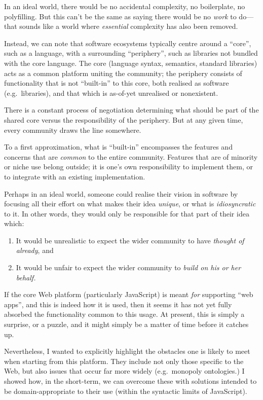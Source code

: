 In an ideal world, there would be no accidental complexity, no
boilerplate, no polyfilling. But this can't be the same as saying there
would be no \emph{work} to do---that sounds like a world where
\emph{essential} complexity has also been removed.

Instead, we can note that software ecosystems typically centre around a
``core'', such as a language, with a surrounding ``periphery'', such as
libraries not bundled with the core language. The core (language syntax,
semantics, standard libraries) acts as a common platform uniting the
community; the periphery consists of functionality that is not
``built-in'' to this core, both realised as software (e.g.~libraries),
and that which is as-of-yet unrealised or nonexistent.

There is a constant process of negotiation determining what should be
part of the shared core versus the responsibility of the periphery. But
at any given time, every community draws the line somewhere.

To a first approximation, what is ``built-in'' encompasses the features
and concerns that are \emph{common} to the entire community. Features
that are of minority or niche use belong outside; it is one's own
responsibility to implement them, or to integrate with an existing
implementation.

Perhaps in an ideal world, someone could realise their vision in
software by focusing all their effort on what makes their idea
\emph{unique}, or what is \emph{idiosyncratic} to it. In other words,
they would only be responsible for that part of their idea which:

\begin{enumerate}
\def\labelenumi{\arabic{enumi}.}
\tightlist
\item
  It would be unrealistic to expect the wider community to have
  \emph{thought of already}, and
\item
  It would be unfair to expect the wider community to \emph{build on his
  or her behalf.}
\end{enumerate}

If the core Web platform (particularly JavaScript) is meant \emph{for}
supporting ``web apps'', and this is indeed how it is used, then it
seems it has not yet fully absorbed the functionality common to this
usage. At present, this is simply a surprise, or a puzzle, and it might
simply be a matter of time before it catches up.

Nevertheless, I wanted to explicitly highlight the obstacles one is
likely to meet when starting from this platform. They include not only
those specific to the Web, but also issues that occur far more widely
(e.g.~monopoly ontologies.) I showed how, in the short-term, we can
overcome these with solutions intended to be domain-appropriate to their
use (within the syntactic limits of JavaScript).

